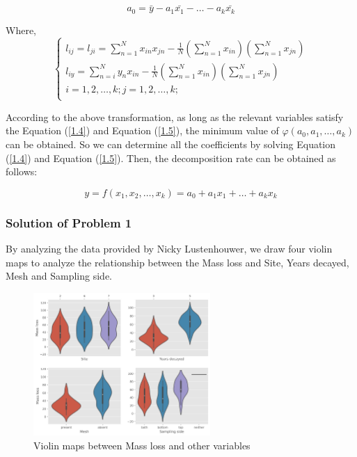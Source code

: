 \begin{equation}\label{1.5}
    a_{0}=\bar{y}-a_{1}\bar{x_{1}}-\dots-a_{k}\bar{x_{k}}
\end{equation}

Where,
\begin{equation}\label{}
\left\{
\begin{array}{l}
    l_{ij}=l_{ji}=\sum_{n = 1}^{N}x_{in}x_{jn}-\frac{1}{N}(\sum_{n = 1}^{N}x_{in})(\sum_{n = 1}^{N}x_{jn})  \\
    l_{iy}=\sum_{n = i}^{N}y_{n}x_{in}-\frac{1}{N}(\sum_{n = 1}^{N}x_{in})(\sum_{n = 1}^{N}x_{jn})  \\
    i=1,2,\dots,k; j=1,2,\dots,k; \\
\end{array}
\right.
\end{equation}

According to the above transformation, as long as the relevant variables satisfy the Equation (\ref{1.4}) and Equation (\ref{1.5}), the minimum value of $\varphi (a_{0},a_{1},\dots,a_{k})$ can be obtained. So we can determine all the coefficients by solving Equation (\ref{1.4}) and Equation (\ref{1.5}). Then, the decomposition rate can be obtained as follows:

\begin{equation}\label{}
    y=f(x_{1},x_{2},\dots,x_{k})=a_{0}+a_{1}x_{1}+\dots+a_{k}x_{k}
\end{equation}

\subsubsection{Solution of Problem 1}

By analyzing the data provided by Nicky Lustenhouwer, we draw four violin maps to analyze the relationship between the Mass loss and Site, Years decayed, Mesh and Sampling side.
\begin{figure}[H]
    \centering
    \includegraphics[width=0.6\textwidth]{./code/fig1.jpg}
    \caption{Violin maps between Mass loss and other variables}\label{fig1}
\end{figure}

